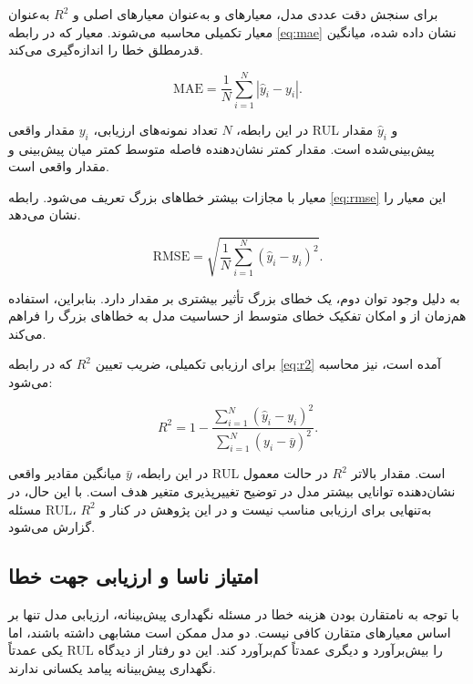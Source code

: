 \documentclass[a4paper,fleqn]{report}
\begin{document}
برای سنجش دقت عددی مدل، معیارهای  و  به‌عنوان
معیارهای اصلی و $R^2$ به‌عنوان معیار تکمیلی محاسبه می‌شوند.
معیار  که در رابطه \ref{eq:mae} نشان داده شده، میانگین قدرمطلق خطا را اندازه‌گیری می‌کند.

\begin{equation}
	\label{eq:mae}
	\mathrm{MAE}
	=
	\frac{1}{N}
	\sum_{i=1}^{N}
	\left|
	\hat{y}_i-y_i
	\right|.
\end{equation}

در این رابطه، $N$ تعداد نمونه‌های ارزیابی، $y_i$ مقدار واقعی
\gls{RUL} و $\hat{y}_i$ مقدار پیش‌بینی‌شده است. مقدار کمتر
 نشان‌دهنده فاصله متوسط کمتر میان پیش‌بینی و مقدار واقعی
است.

معیار  با مجازات بیشتر خطاهای بزرگ تعریف می‌شود. رابطه \ref{eq:rmse} این معیار را نشان می‌دهد.

\begin{equation}
	\label{eq:rmse}
	\mathrm{RMSE}
	=
	\sqrt{
		\frac{1}{N}
		\sum_{i=1}^{N}
		(\hat{y}_i-y_i)^2
	}.
\end{equation}

به دلیل وجود توان دوم، یک خطای بزرگ تأثیر بیشتری بر مقدار
 دارد. بنابراین، استفاده هم‌زمان از 
  و
امکان تفکیک خطای متوسط از حساسیت مدل به خطاهای بزرگ را
فراهم می‌کند.

برای ارزیابی تکمیلی، ضریب تعیین $R^2$ که در رابطه 
\ref{eq:r2}
آمده است، نیز محاسبه می‌شود:

\begin{equation}
	\label{eq:r2}
	R^2
	=
	1-
	\frac{
		\sum_{i=1}^{N}
		(\hat{y}_i-y_i)^2
	}{
		\sum_{i=1}^{N}
		(y_i-\bar{y})^2
	}.
\end{equation}

در این رابطه، $\bar{y}$ میانگین مقادیر واقعی \gls{RUL} است.
مقدار بالاتر $R^2$ در حالت معمول نشان‌دهنده توانایی بیشتر مدل در
توضیح تغییرپذیری متغیر هدف است. با این حال، در مسئله
\gls{RUL}،
 $R^2$
  به‌تنهایی برای ارزیابی مناسب نیست و در این
پژوهش در کنار  و  گزارش می‌شود.

\subsection{امتیاز ناسا و ارزیابی جهت خطا}
\label{sec:nasa-score}

با توجه به نامتقارن بودن هزینه خطا در مسئله نگهداری پیش‌بینانه،
ارزیابی مدل تنها بر اساس معیارهای متقارن کافی نیست. دو مدل ممکن
است  مشابهی داشته باشند، اما یکی عمدتاً \gls{RUL} را
بیش‌برآورد و دیگری عمدتاً کم‌برآورد کند. این دو رفتار از دیدگاه
نگهداری پیش‌بینانه پیامد یکسانی ندارند.
\end{document}
